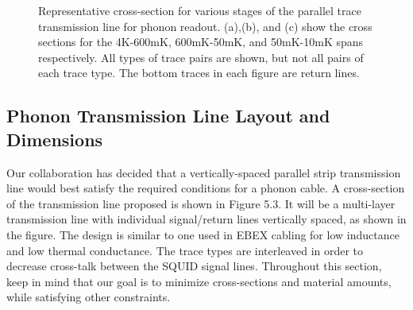 \documentclass{report}
\begin{document}
\begin{figure}[h]
\begin{center}
\newline
{}\newline
{}
\caption{Representative cross-section for various stages of the parallel trace transmission line for phonon readout. (a),(b), and (c) show the cross sections for the 4K-600mK, 600mK-50mK, and 50mK-10mK spans respectively. All types of trace pairs are shown, but not all pairs of each trace type. The bottom traces in each figure are return lines.}
\end{center}
\end{figure}

\subsection{Phonon Transmission Line Layout and Dimensions}

Our collaboration has decided that a vertically-spaced parallel strip transmission line would best satisfy the required conditions for a phonon cable. A cross-section of the transmission line proposed is shown in Figure 5.3. It will be a multi-layer transmission line with individual signal/return lines vertically spaced, as shown in the figure. The design is similar to one used in EBEX cabling \cite{Polsgrove2009} for low inductance and low thermal conductance. The trace types are interleaved in order to decrease cross-talk between the SQUID signal lines. Throughout this section, keep in mind that our goal is to minimize cross-sections and material amounts, while satisfying other constraints.
\end{document}
